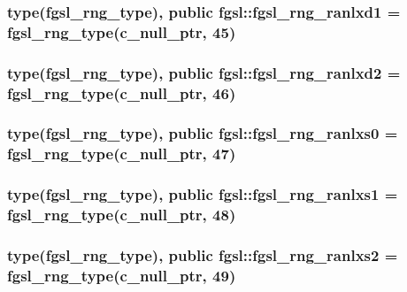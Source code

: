 \subsubsection[{fgsl\+\_\+rng\+\_\+ranlxd1}]{\setlength{\rightskip}{0pt plus 5cm}type({\bf fgsl\+\_\+rng\+\_\+type}), public fgsl\+::fgsl\+\_\+rng\+\_\+ranlxd1 = {\bf fgsl\+\_\+rng\+\_\+type}(c\+\_\+null\+\_\+ptr, 45)}\label{namespacefgsl_a524c5eebeb98cf095b5bfe9bde105de5}
\hypertarget{namespacefgsl_ab9c54c86c74196b01b8038402c43038a}{}
\subsubsection[{fgsl\+\_\+rng\+\_\+ranlxd2}]{\setlength{\rightskip}{0pt plus 5cm}type({\bf fgsl\+\_\+rng\+\_\+type}), public fgsl\+::fgsl\+\_\+rng\+\_\+ranlxd2 = {\bf fgsl\+\_\+rng\+\_\+type}(c\+\_\+null\+\_\+ptr, 46)}\label{namespacefgsl_ab9c54c86c74196b01b8038402c43038a}
\hypertarget{namespacefgsl_a7114194063748411f9f00507745269fa}{}
\subsubsection[{fgsl\+\_\+rng\+\_\+ranlxs0}]{\setlength{\rightskip}{0pt plus 5cm}type({\bf fgsl\+\_\+rng\+\_\+type}), public fgsl\+::fgsl\+\_\+rng\+\_\+ranlxs0 = {\bf fgsl\+\_\+rng\+\_\+type}(c\+\_\+null\+\_\+ptr, 47)}\label{namespacefgsl_a7114194063748411f9f00507745269fa}
\hypertarget{namespacefgsl_aa3756069479859f5b94693230b23f052}{}
\subsubsection[{fgsl\+\_\+rng\+\_\+ranlxs1}]{\setlength{\rightskip}{0pt plus 5cm}type({\bf fgsl\+\_\+rng\+\_\+type}), public fgsl\+::fgsl\+\_\+rng\+\_\+ranlxs1 = {\bf fgsl\+\_\+rng\+\_\+type}(c\+\_\+null\+\_\+ptr, 48)}\label{namespacefgsl_aa3756069479859f5b94693230b23f052}
\hypertarget{namespacefgsl_a961029daf705e420d4626038ceffbdc5}{}
\subsubsection[{fgsl\+\_\+rng\+\_\+ranlxs2}]{\setlength{\rightskip}{0pt plus 5cm}type({\bf fgsl\+\_\+rng\+\_\+type}), public fgsl\+::fgsl\+\_\+rng\+\_\+ranlxs2 = {\bf fgsl\+\_\+rng\+\_\+type}(c\+\_\+null\+\_\+ptr, 49)}\label{namespacefgsl_a961029daf705e420d4626038ceffbdc5}
\hypertarget{namespacefgsl_a099ffd8b436045a9bd570027a1406df4}{}
